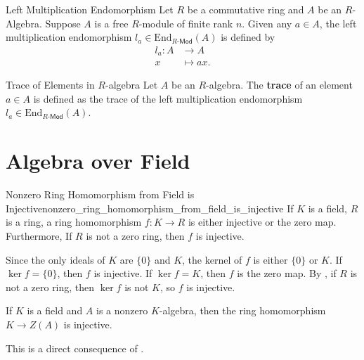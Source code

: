 \begin{example}{Left Multiplication Endomorphism}{}
    Let $R$ be a commutative ring and $A$ be an $R$-Algebra. Suppose $A$ is a free $R$-module of finite rank $n$. Given any $a\in A$, the left multiplication endomorphism $l_a\in\mathrm{End}_{R\text{-}\mathsf{Mod}}(A)$ is defined by
    \begin{align*}
        l_a:A &\longrightarrow A\\
        x &\longmapsto ax.
    \end{align*}
\end{example}


\begin{definition}{Trace of Elements in $R$-algebra}{}
    Let $A$ be an $R$-algebra. The \textbf{trace} of an element $a\in A$ is defined as the trace of the left multiplication endomorphism $l_a\in\mathrm{End}_{R\text{-}\mathsf{Mod}}(A)$.
\end{definition}

\section{Algebra over Field}
\begin{lemma}{Nonzero Ring Homomorphism from Field is Injective}{nonzero_ring_homomorphism_from_field_is_injective}
    If $K$ is a field, $R$ is a ring, a ring homomorphism $f:K\to R$ is either injective or the zero map. Furthermore, If $R$ is not a zero ring, then $f$ is injective.
\end{lemma}
\begin{prf}
    Since the only ideals of $K$ are $\{0\}$ and $K$, the kernel of $f$ is either $\{0\}$ or $K$. If $\ker f=\{0\}$, then $f$ is injective. If $\ker f=K$, then $f$ is the zero map. By , if $R$ is not a zero ring, then $\ker f$ is not $K$, so $f$ is injective.
\end{prf}

\begin{corollary}{}{}
    If $K$ is a field and $A$ is a nonzero $K$-algebra, then the ring homomorphism $K\to Z(A)$ is injective.
\end{corollary}
\begin{prf}
    This is a direct consequence of .
\end{prf}


